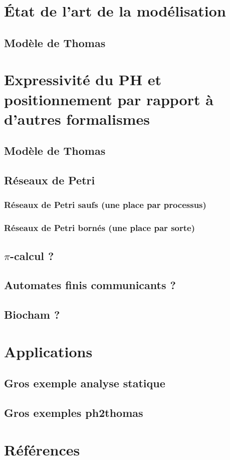 \documentclass[a4paper,french]{report}
\theoremstyle{definition}
\theoremstyle{remark}
\begin{document}
\setcounter{tocdepth}{2}
\setcounter{secnumdepth}{3}
\tableofcontents






\chapter{État de l'art de la modélisation}
  \section{Modèle de Thomas}
  





\chapter{Expressivité du PH et positionnement par rapport à d'autres formalismes}
  \section{Modèle de Thomas}
  \section{Réseaux de Petri}
    \subsection{Réseaux de Petri saufs (une place par processus)}
    \subsection{Réseaux de Petri bornés (une place par sorte)}
  \section{$\pi$-calcul ?}
  \section{Automates finis communicants ?}
  \section{Biocham ?}

\chapter{Applications}
  \section{Gros exemple analyse statique}
  \section{Gros exemples ph2thomas}


  
\chapter*{Références}
%

\end{document}

